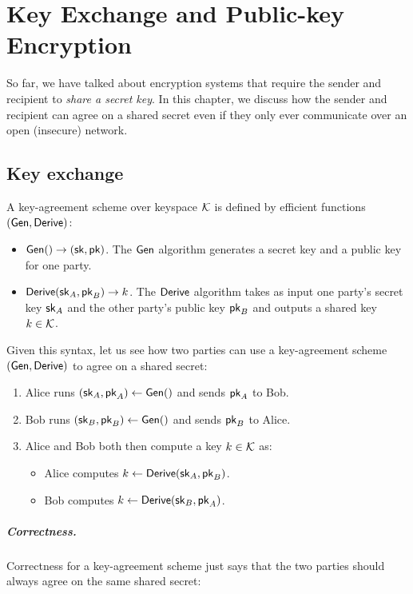 \chapter{Key Exchange and Public-key Encryption}

So far, we have talked about encryption systems that require
the sender and recipient to \emph{share a secret key}.
In this chapter, we discuss how the sender and recipient
can agree on a shared secret even if they only ever communicate
over an open (insecure) network.

\section{Key exchange}

A key-agreement scheme over keyspace $\mathcal{K}$ is defined by efficient functions $(\mathsf{Gen}, \mathsf{Derive})$:
\begin{itemize}[noitemsep]
  \item $\mathsf{Gen}() \to ({\mathsf{sk}}, \mathsf{pk})$. The $\mathsf{Gen}$ algorithm 
    generates a secret key and a public key for one party.
  \item $\mathsf{Derive}({\mathsf{sk}}_A, \mathsf{pk}_B) \to k$. The $\mathsf{Derive}$ algorithm
    takes as input one party's secret key ${\mathsf{sk}}_A$ and the
    other party's public key $\mathsf{pk}_B$ and outputs a shared
    key $k \in \mathcal{K}$.
\end{itemize}

Given this syntax, let us see how two parties can use a key-agreement 
scheme $(\mathsf{Gen}, \mathsf{Derive})$ to agree on a shared secret:
\begin{enumerate}[noitemsep]
  \item Alice runs $({\mathsf{sk}}_A, \mathsf{pk}_A) \gets \mathsf{Gen}()$ and sends $\mathsf{pk}_A$ to Bob.
  \item Bob runs $({\mathsf{sk}}_B, \mathsf{pk}_B) \gets \mathsf{Gen}()$ and sends $\mathsf{pk}_B$ to Alice.
	\item Alice and Bob both then compute a key $k \in \mathcal{K}$ as:
		\begin{itemize}
      \item Alice computes $k \gets \mathsf{Derive}({\mathsf{sk}}_A, \mathsf{pk}_B)$.
      \item Bob computes $k \gets \mathsf{Derive}({\mathsf{sk}}_B, \mathsf{pk}_A)$.
		\end{itemize}
\end{enumerate}


\paragraph{Correctness.} 
Correctness for a key-agreement scheme just says that the two parties
should always agree on the same shared secret:

